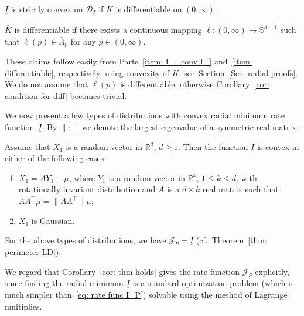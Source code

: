 \documentclass[10pt]{amsart}
\theoremstyle{definition}\newtheorem{defi}[theo]{Definition}\newtheorem{rema}[theo]{Remark}\newtheorem{exam}[theo]{Example}\newtheorem{exem}[theo]{Example}\newtheorem{nota}[theo]{Notation}
\newcommand{\ubar}[1]{\underline{#1}}
\newcommand{\Rbb}{\mathbb{R}}
\newcommand{\Sbb}{\mathbb{S}}
\newcommand{\Dcl}{\mathcal{D}}
\newcommand{\Jcl}{\mathcal{J}}
\newcommand*{\alphenumi}{\renewcommand*{\theenumi}{\alph{enumi}}}
\begin{document}
\begin{coro} \label{cor: L differentiable}
$\ubar I$ is strictly convex on $\Dcl_{\ubar I}$ if $\bar K$ is differentiable on $(0, \infty)$.
\end{coro}


\begin{coro} \label{cor: condition for diff}
$\bar K$ is differentiable if there exists a continuous mapping $\ell: (0, \infty) \to \Sbb^{d-1}$ such that $\ell(p) \in \bar \Lambda_p$ for any $p \in (0,\infty)$.
\end{coro}

These claims follow easily from Parts~\eqref{item: I_=conv I_} and~\eqref{item: differentiable}, respectively, using convexity of $\bar K$; see~Section~\ref{Sec: radial proofs}. We do not assume that $\ell(p)$ is differentiable, otherwise Corollary~\ref{cor: condition for diff} becomes trivial.

We now present a few types of distributions with convex radial minimum rate function~$\ubar I$. By $\| \cdot \|$ we denote the largest eigenvalue of a symmetric real matrix.

\begin{prop}\label{prop: conjecture holds}
Assume that $X_1$ is a random vector in $\Rbb^d$, $d \ge 1$. Then the function $\ubar I$ is convex in either of the following cases:
\begin{enumerate}\alphenumi
\item \label{item: pseudo-affine}
$X_1=A Y_1 + \mu$, where $Y_1$ is a random vector in $\Rbb^k$, $1 \le k \le d$, with rotationally invariant distribution and $A$ is a $d \times k$ real matrix such that $A A^\top \mu =\|A A^\top \! \| \mu$;

\item \label{item: Gaussian}
$X_1$ is Gaussian.
\end{enumerate}
\end{prop}


\begin{coro} \label{cor: thm holds}
For the above types of distributions, we have $\Jcl_P = \ubar I$ (cf.~Theorem~\ref{thm: perimeter LD}).
\end{coro}

We regard that Corollary~\ref{cor: thm holds} gives the rate function $\Jcl_P $ explicitly, since finding the radial minimum $\ubar I$ is a standard optimization problem (which is much simpler than~\eqref{eq: rate func I_P}) solvable using the method of Lagrange multiplies.
\end{document}

